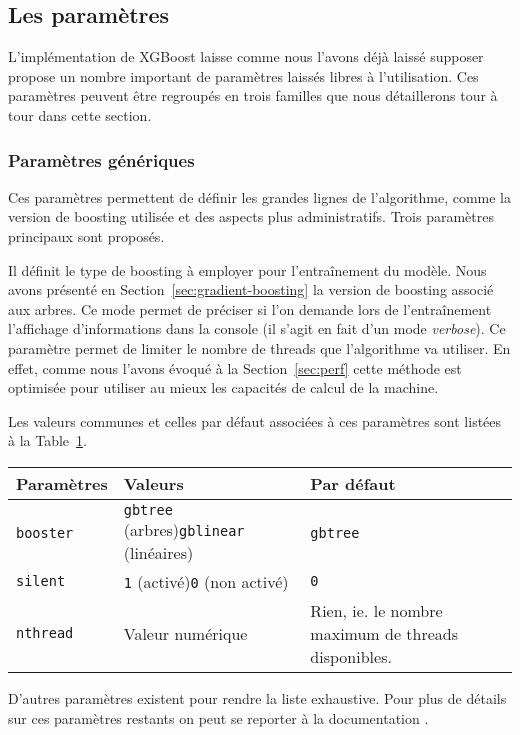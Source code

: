 \subsection{Les paramètres}
\label{sec:params}
L'implémentation de XGBoost laisse comme nous l'avons déjà laissé supposer propose un nombre important de paramètres laissés libres à l'utilisation. Ces paramètres peuvent être regroupés en trois familles que nous détaillerons tour à tour dans cette section.
\subsubsection{Paramètres génériques}
Ces paramètres permettent de définir les grandes lignes de l'algorithme, comme la version de boosting utilisée et des aspects plus \og administratifs\fg. Trois paramètres principaux sont proposés.

Il définit le type de boosting à employer pour l'entraînement du modèle. Nous avons présenté en Section~\ref{sec:gradient-boosting} la version de boosting associé aux arbres.
Ce mode permet de préciser si l'on demande lors de l'entraînement l'affichage d'informations dans la console (il s'agit en fait d'un mode \textit{verbose}).
Ce paramètre permet de limiter le nombre de threads que l'algorithme va utiliser. En effet, comme nous l'avons évoqué à la Section~\ref{sec:perf} cette méthode est optimisée pour utiliser au mieux les capacités de calcul de la machine.

Les valeurs communes et celles par défaut associées à ces paramètres sont listées à la Table~\ref{tab:params-generiques}.

\begin{table}[h]
  \begin{margincap}
    \centering
    \begin{tabular}[\margincapalign]{p{}p{}p{}}
	\toprule
	\textbf{Paramètres}& \textbf{Valeurs} & \textbf{Par défaut} \\
	\midrule
	\texttt{booster}  & \texttt{gbtree} (arbres)\newline\texttt{gblinear} (linéaires) & \texttt{gbtree} \\
	\texttt{silent}   & \texttt{1} (activé)\newline\texttt{0} (non activé)& \texttt{0}\\
	\texttt{nthread}  & Valeur numérique & Rien, ie. le nombre maximum de threads disponibles. \\
	\bottomrule
    \end{tabular}
	\label{tab:params-generiques}
  \end{margincap}
\end{table}
D'autres paramètres existent pour rendre la liste exhaustive. Pour plus de détails sur ces paramètres restants on peut se reporter à la documentation \cite{bib:xgboost-main}.

